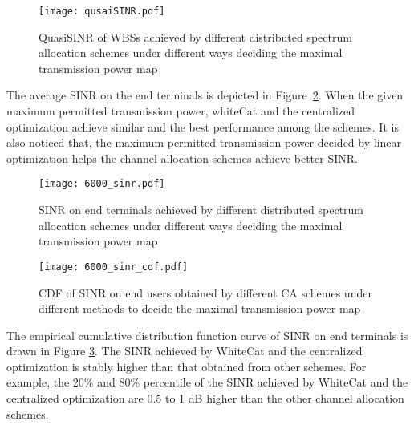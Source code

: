    \begin{figure}[h!]
       \centering
       \texttt{[image: qusaiSINR.pdf]}
       \caption{QuasiSINR of WBSs achieved by different distributed spectrum allocation schemes under different ways deciding the maximal transmission power map}
	\label{qusaiSINR}
     \end{figure}
     
The average SINR on the end terminals is depicted in Figure~\ref{6000_sinr}.
When the given maximum permitted transmission power, whiteCat and the centralized optimization achieve similar and the best performance among the schemes.
It is also noticed that, the maximum permitted transmission power decided by linear optimization helps the channel allocation schemes achieve better SINR.
     \begin{figure}[h!]
       \centering
       \texttt{[image: 6000\_sinr.pdf]}
       \caption{SINR on end terminals achieved by different distributed spectrum allocation schemes under different ways deciding the maximal transmission power map}
	\label{6000_sinr}
     \end{figure}

  \begin{figure}[h!]
     \centering
     \texttt{[image: 6000\_sinr\_cdf.pdf]}
     \caption{CDF of SINR on end users obtained by different CA schemes under different methods to decide the maximal transmission power map}
     \label{6000_sinr_cdf}
  \end{figure}

The empirical cumulative distribution function curve of SINR on end terminals is drawn in Figure \ref{6000_sinr_cdf}.
The SINR achieved by WhiteCat and the centralized optimization is stably higher than that obtained from other schemes.
For example, the 20\% and 80\% percentile of the SINR achieved by WhiteCat and the centralized optimization are 0.5 to 1 dB higher than the other channel allocation schemes.




